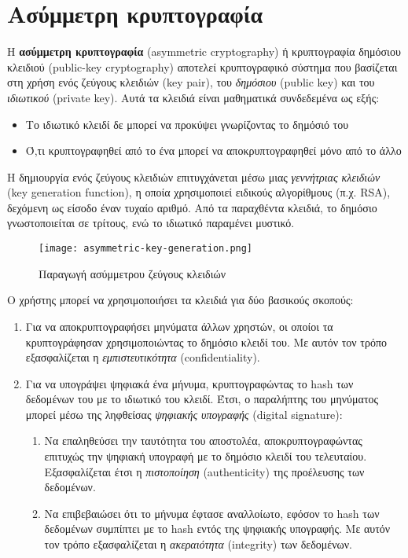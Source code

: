 \section{Ασύμμετρη κρυπτογραφία}

Η \textbf{ασύμμετρη κρυπτογραφία} (asymmetric cryptography) ή κρυπτογραφία δημόσιου κλειδιού (public-key cryptography) αποτελεί κρυπτογραφικό σύστημα που βασίζεται στη χρήση ενός ζεύγους κλειδιών (key pair), του \textit{δημόσιου} (public key) και του \textit{ιδιωτικού} (private key). Αυτά τα κλειδιά είναι μαθηματικά συνδεδεμένα ως εξής:

\begin{itemize}
	\item Το ιδιωτικό κλειδί δε μπορεί να προκύψει γνωρίζοντας το δημόσιό του
	\item Ό,τι κρυπτογραφηθεί από το ένα μπορεί να αποκρυπτογραφηθεί μόνο από το άλλο 
\end{itemize}
	
Η δημιουργία ενός ζεύγους κλειδιών επιτυγχάνεται μέσω μιας \textit{γεννήτριας κλειδιών} (key generation function), η οποία χρησιμοποιεί ειδικούς αλγορίθμους (π.χ. RSA), δεχόμενη ως είσοδο έναν τυχαίο αριθμό. Από τα παραχθέντα κλειδιά, το δημόσιο γνωστοποιείται σε τρίτους, ενώ το ιδιωτικό παραμένει μυστικό.

\begin{figure}[H]
	\centering
	\texttt{[image: asymmetric-key-generation.png]}
	\caption{Παραγωγή ασύμμετρου ζεύγους κλειδιών}
\end{figure}

Ο χρήστης μπορεί να χρησιμοποιήσει τα κλειδιά για δύο βασικούς σκοπούς:

\begin{enumerate}
	\item Για να αποκρυπτογραφήσει μηνύματα άλλων χρηστών, οι οποίοι τα κρυπτογράφησαν χρησιμοποιώντας το δημόσιο κλειδί του. Με αυτόν τον τρόπο εξασφαλίζεται η \textit{εμπιστευτικότητα} (confidentiality).
	\item Για να υπογράψει ψηφιακά ένα μήνυμα, κρυπτογραφώντας το hash των δεδομένων του με το ιδιωτικό του κλειδί. Έτσι, ο παραλήπτης του μηνύματος μπορεί μέσω της ληφθείσας \textit{ψηφιακής υπογραφής} (digital signature):
	\begin{enumerate}
		\item Να επαληθεύσει την ταυτότητα του αποστολέα, αποκρυπτογραφώντας επιτυχώς την ψηφιακή υπογραφή με το δημόσιο κλειδί του τελευταίου. Εξασφαλίζεται έτσι η \textit{πιστοποίηση} (authenticity) της προέλευσης των δεδομένων.
		\item Να επιβεβαιώσει ότι το μήνυμα έφτασε αναλλοίωτο, εφόσον το hash των δεδομένων συμπίπτει με το hash εντός της ψηφιακής υπογραφής. Με αυτόν τον τρόπο εξασφαλίζεται η \textit{ακεραιότητα} (integrity) των δεδομένων.
	\end{enumerate}
\end{enumerate}

